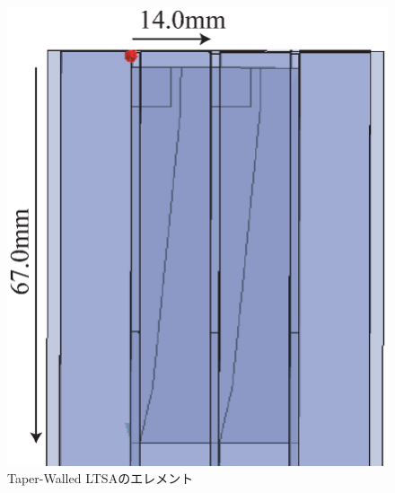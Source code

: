 ﻿\documentclass[12pt,oneside]{jsbook}
\begin{document}
\begin{figure}[t]
\begin{center}
\includegraphics[width =\hsize]{TWLTSA.eps}
\caption{Taper-Walled LTSAのエレメント} \label{TWLTSA} 
\end{center}
\end{figure}
\end{document}
